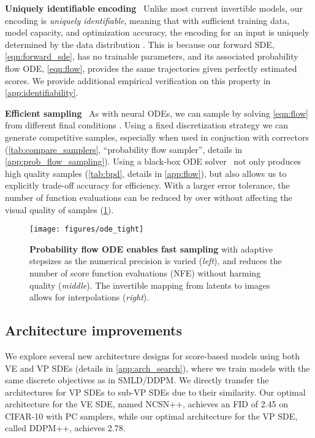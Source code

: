 \documentclass{article} \usepackage{iclr2021_conference,times}
\begin{document}
\textbf{Uniquely identifiable encoding}~ Unlike most current invertible models, 
our encoding is {\em uniquely identifiable}, meaning that with sufficient training data, model capacity, and optimization accuracy, the encoding for an input is uniquely determined by the data distribution \citep{roeder2020linear}. This is because our forward SDE, \cref{eqn:forward_sde}, has no trainable parameters, and its associated probability flow ODE, \cref{eqn:flow}, provides the same trajectories given perfectly estimated scores. We provide additional empirical verification on this property in \cref{app:identifiability}.

\textbf{Efficient sampling}~ As with neural ODEs, we can sample  by solving \cref{eqn:flow} from different final conditions . Using a fixed discretization strategy we can generate competitive samples, especially when used in conjuction with correctors (\cref{tab:compare_samplers},  ``probability flow sampler'', details in \cref{app:prob_flow_sampling}). Using a black-box ODE solver~\citep{dormand1980family} not only produces high quality samples (\cref{tab:bpd}, details in \cref{app:flow}), but also allows us to explicitly trade-off accuracy for efficiency. With a larger error tolerance, the number of function evaluations can be reduced by over  without affecting the visual quality of samples (\cref{fig:prob_flow}).
\begin{figure}
    \centering
    \texttt{[image: figures/ode\_tight]}
    \vspace{-5mm}
    \caption{{\bf Probability flow ODE enables fast sampling} with adaptive stepsizes as the numerical precision is varied (\textit{left}), and reduces the number of score function evaluations (NFE) without harming quality (\textit{middle}). The invertible mapping from latents to images allows for interpolations (\textit{right}).}
    \label{fig:prob_flow}
\end{figure}



\subsection{Architecture improvements}\label{sec:arch}



We explore several new architecture designs for score-based models using both VE and VP SDEs (details in \cref{app:arch_search}), where we train models with the same discrete objectives as in SMLD/DDPM. We directly transfer the architectures for VP SDEs to sub-VP SDEs due to their similarity. Our optimal architecture for the VE SDE, named NCSN++, achieves an FID of 2.45 on CIFAR-10 with PC samplers, while our optimal architecture for the VP SDE, called DDPM++, achieves 2.78.
\end{document}
